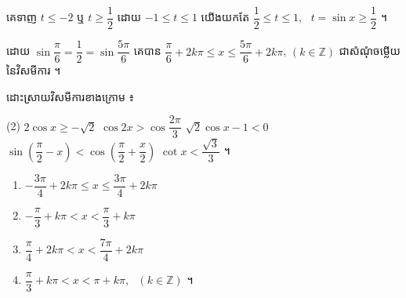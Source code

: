 គេទាញ $t \le -2$ ឬ $t \ge \dfrac{1}{2}$ ដោយ $-1 \le t \le 1$ យើងយកតែ $\dfrac{1}{2} \le t \le 1$, \ $t = \sin x \ge \dfrac{1}{2}$ ។

ដោយ $\sin\dfrac{\pi}{6} = \dfrac{1}{2} = \sin\dfrac{5\pi}{6}$ គេបាន $\dfrac{\pi}{6} + 2k\pi \le x \le \dfrac{5\pi}{6} + 2k\pi$, $(k \in \mathbb{Z})$ ជាសំណុំចម្លើយនៃវិសមីការ ។

\begin{pro}
ដោះស្រាយវិសមីការខាងក្រោម ៖
\begin{tasks}(2)
  \task $2\cos x \ge -\sqrt{2}$
  \task $\cos 2x > \cos\dfrac{2\pi}{3}$
  \task $\sqrt{2}\cos x - 1 < 0$
  \task $\sin\left(\dfrac{\pi}{2} - x\right) < \cos\left(\dfrac{\pi}{2} + \dfrac{x}{2}\right)$
  \task $\cot x < \dfrac{\sqrt{3}}{3}$ ។
\end{tasks}
\ans
\begin{enumerate}[a]
  \item $-\dfrac{3\pi}{4} + 2k\pi \le x \le \dfrac{3\pi}{4} + 2k\pi$
  \item $-\dfrac{\pi}{3} + k\pi < x < \dfrac{\pi}{3} + k\pi$
  \item $\dfrac{\pi}{4} + 2k\pi < x < \dfrac{7\pi}{4} + 2k\pi$
  \item[ង.] $\dfrac{\pi}{3} + k\pi < x < \pi + k\pi$, \ $(k \in \mathbb{Z})$ ។
\end{enumerate}
\end{pro}

